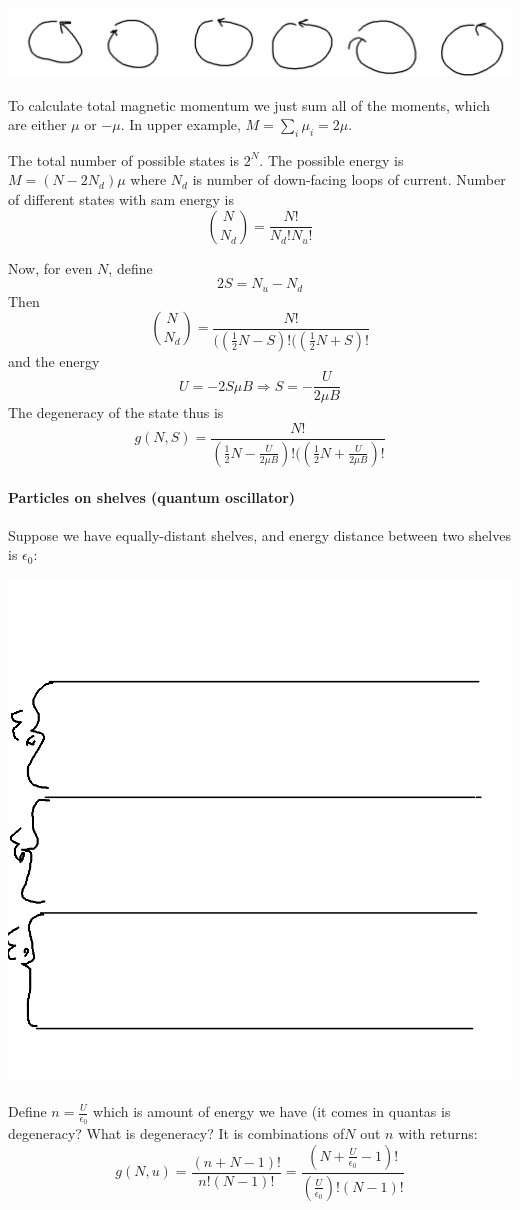 \begin{center}
	\includegraphics[width=0.5\linewidth]{./lect1/pic2.png}
\end{center}
To calculate total magnetic momentum we just sum all of the moments, which are either $\mu$ or $-\mu$. In upper example, $M = \sum_i \mu_i = 2\mu$.


The total number of possible states is $2^N$. The possible energy is $M = (N-2N_d)\mu$ where $N_d$ is number of down-facing loops of current. Number of different states with sam energy is $$\binom{N}{N_d} = \frac{N!}{N_d!N_u!}$$

Now, for even $N$, define 
$$2S = N_u -N_d$$
Then
$$\binom{N}{N_d} = \frac{N!}{(\left(\frac{1}{2} N - S\right)!(\left(\frac{1}{2} N + S\right)!}$$
and the energy
$$U = -2S\mu B \Rightarrow S = -\frac{U}{2\mu B}$$
The degeneracy of the state thus is
$$g(N,S) = \frac{N!}{\left(\frac{1}{2} N - \frac{U}{2\mu B}\right)!(\left(\frac{1}{2} N + \frac{U}{2\mu B}\right)!}$$ 
\paragraph{Particles on shelves (quantum oscillator)}
Suppose we have equally-distant shelves, and energy distance between two shelves is $\epsilon_0$:
\begin{center}
	\includegraphics[width=0.5\linewidth]{./lect1/pic3.png}
\end{center}
Define $n=\frac{U}{\epsilon_0}$ which is amount of energy we have (it comes in quantas is degeneracy? What is degeneracy? It is combinations of$N$ out $n$ with returns:
$$g(N,u) = \frac{(n+N-1)!}{n!(N-1)!} = \frac{\left(N+\frac{U}{\epsilon_0} - 1\right)!}{\left(\frac{U}{\epsilon_0}\right)!(N-1)!}$$

